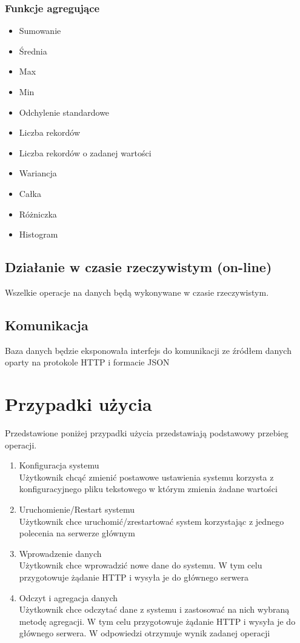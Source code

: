 \documentclass[paper=a4, fontsize=11pt]{scrartcl} %
\numberwithin{equation}{section} %
\numberwithin{figure}{section} %
\numberwithin{table}{section} %
\begin{document}
        \subsubsection{Funkcje agregujące}
        \begin{itemize}
            \item Sumowanie
            \item Średnia
            \item Max
            \item Min
            \item Odchylenie standardowe
            \item Liczba rekordów
            \item Liczba rekordów o zadanej wartości
            \item Wariancja
            \item Całka
            \item Różniczka
            \item Histogram
        \end{itemize}
    \subsection{Działanie w czasie rzeczywistym (on-line)}
    Wszelkie operacje na danych będą wykonywane w czasie rzeczywistym.
    \subsection{Komunikacja}
    Baza danych będzie eksponowała interfejs do komunikacji ze źródłem danych oparty na protokole HTTP i formacie JSON

\section{Przypadki użycia}
    Przedstawione poniżej przypadki użycia przedstawiają podstawowy przebieg operacji.
    \begin{enumerate}
        \item Konfiguracja systemu
        \\Użytkownik chcąć zmienić postawowe ustawienia systemu korzysta z konfiguracyjnego pliku tekstowego w którym
        zmienia żadane wartości
        \item Uruchomienie/Restart systemu
        \\Użytkownik chce uruchomić/zrestartować system korzystając z jednego polecenia na serwerze głównym
        \item Wprowadzenie danych
        \\Użytkownik chce wprowadzić nowe dane do systemu. W tym celu przygotowuje żądanie HTTP i wysyła je do
        głównego serwera
        \item Odczyt i agregacja danych
        \\Użytkownik chce odczytać dane z systemu i zastosować na nich wybraną metodę agregacji. W tym celu przygotowuje
        żądanie HTTP i wysyła je do głównego serwera. W odpowiedzi otrzymuje wynik zadanej operacji

    \end{enumerate}
\end{document}
